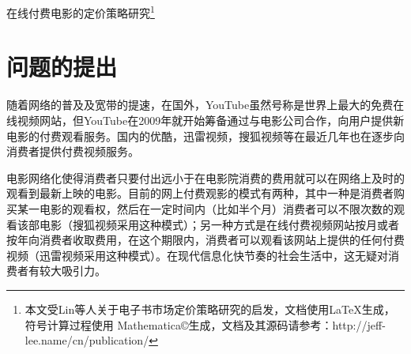 \documentclass[paper=a4, fontsize=10.5pt]{scrartcl} %
\numberwithin{equation}{section} %
\numberwithin{figure}{section} %
\numberwithin{table}{section} %
\begin{document}
\begin{CJK}{UTF8}{gbsn}
\sffamily
\newcommand{\horrule}[1]{\rule{\linewidth}{#1}} %







\newpage
\begin{center}
	\huge 在线付费电影的定价策略研究\footnote{本文受Lin等人关于电子书市场定价策略研究的启发\cite{LinHao2014}，文档使用\LaTeX 生成，符号计算过程使用 Mathematica\copyright 生成，文档及其源码请参考：http://jeff-lee.name/cn/publication/}
\end{center}
\section{问题的提出}
随着网络的普及及宽带的提速，在国外，YouTube虽然号称是世界上最大的免费在线视频网站，但YouTube在2009年就开始筹备通过与电影公司合作，向用户提供新电影的付费观看服务。国内的优酷，迅雷视频，搜狐视频等在最近几年也在逐步向消费者提供付费视频服务。

电影网络化使得消费者只要付出远小于在电影院消费的费用就可以在网络上及时的观看到最新上映的电影。目前的网上付费观影的模式有两种，其中一种是消费者购买某一电影的观看权，然后在一定时间内（比如半个月）消费者可以不限次数的观看该部电影（搜狐视频采用这种模式）；另一种方式是在线付费视频网站按月或者按年向消费者收取费用，在这个期限内，消费者可以观看该网站上提供的任何付费视频（迅雷视频采用这种模式）。在现代信息化快节奏的社会生活中，这无疑对消费者有较大吸引力。


\end{CJK}
\end{document}
